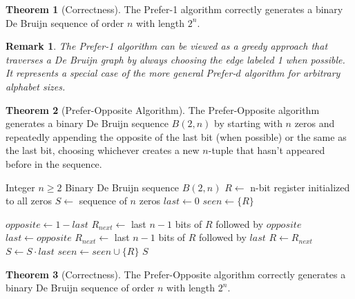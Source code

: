 \documentclass{article}
\newtheorem{remark}{Remark}
\theoremstyle{definition}
\newtheorem{theorem}{Theorem}
\begin{document}
\begin{theorem}[Correctness]
The Prefer-1 algorithm correctly generates a binary De Bruijn sequence of order $n$ with length $2^n$.
\end{theorem}

\begin{remark}
The Prefer-1 algorithm can be viewed as a greedy approach that traverses a De Bruijn graph by always choosing the edge labeled 1 when possible. It represents a special case of the more general Prefer-$d$ algorithm for arbitrary alphabet sizes.
\end{remark}

\begin{theorem}[Prefer-Opposite Algorithm]
The Prefer-Opposite algorithm generates a binary De Bruijn sequence $B(2, n)$ by starting with $n$ zeros and repeatedly appending the opposite of the last bit (when possible) or the same as the last bit, choosing whichever creates a new $n$-tuple that hasn't appeared before in the sequence.
\end{theorem}

\begin{algorithm}
\caption{Prefer-Opposite Algorithm for $B(2, n)$}
\begin{algorithmic}[1]
\Require Integer $n \geq 2$
\Ensure Binary De Bruijn sequence $B(2, n)$
\State $R \gets $ n-bit register initialized to all zeros
\State $S \gets $ sequence of $n$ zeros 
\State $last \gets 0$ 
\State $seen \gets \{R\}$ 

    \State $opposite \gets 1-last$ 
    \State $R_{next} \gets $ last $n-1$ bits of $R$ followed by $opposite$
        \State $last \gets opposite$ 
    \Else
        \State $R_{next} \gets $ last $n-1$ bits of $R$ followed by $last$
    \EndIf
    \State $R \gets R_{next}$ 
    \State $S \gets S \cdot last$ 
    \State $seen \gets seen \cup \{R\}$
\EndWhile
\State \Return $S$
\end{algorithmic}
\end{algorithm}

\begin{theorem}[Correctness]
The Prefer-Opposite algorithm correctly generates a binary De Bruijn sequence of order $n$ with length $2^n$.
\end{theorem}
\end{document}
